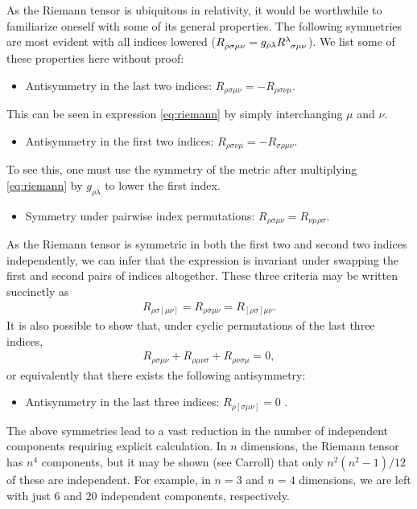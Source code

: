 \documentclass[10pt]{article}
\begin{document}
    \par As the Riemann tensor is ubiquitous in relativity, it would be worthwhile to familiarize oneself with some of its general properties. The following symmetries are most evident with all indices lowered ($\tensor{R}{_\rho_\sigma_\mu_\nu}=g_{\rho\lambda}\tensor{R}{^\lambda_\sigma_\mu_\nu}$). We list some of these properties here without proof:
    \begin{itemize}
		\item Antisymmetry in the last two indices:	$R_{\rho\sigma \mu \nu} = -R_{\rho\sigma \nu \mu} $.
    \end{itemize}
    This can be seen in expression \eqref{eq:riemann} by simply interchanging $\mu$ and $\nu$. 
    \begin{itemize}
    	\item Antisymmetry in the first two indices:	$R_{\rho\sigma \nu \mu} = -R_{\sigma \rho\mu \nu} $.
    \end{itemize}
    To see this, one must use the symmetry of the metric after multiplying \eqref{eq:riemann} by $g_{\rho\lambda}$ to lower the first index. 
    \begin{itemize}
    	\item Symmetry under pairwise index permutations:	 $R_{\rho\sigma \mu \nu} = R_{\nu \mu \rho\sigma} $.
    \end{itemize}
    As the Riemann tensor is symmetric in both the first two and second two indices independently, we can infer that the expression is invariant under swapping the first and second pairs of indices altogether. These three criteria may be written succinctly as 
    \begin{align}
   		R_{\rho\sigma \left[\mu \nu\right]} = R_{\rho\sigma\mu\nu} = R_{[\rho\sigma]\mu\nu} . \label{eq:pair_symmetries}
   	\end{align}
   	It is also possible to show that, under cyclic permutations of the last three indices, 
   	\begin{align}
    	 R_{\rho\sigma\mu\nu} + R_{\rho\mu\nu\sigma} + R_{\rho\nu\sigma\mu} = 0,
    \end{align}
    or equivalently that there exists the following antisymmetry:
    \begin{itemize}
    	\item Antisymmetry in the last three indices: $R_{\rho\left[\sigma\mu\nu\right]}=0$ .
    \end{itemize}
    The above symmetries lead to a vast reduction in the number of independent components requiring explicit calculation. In $n$ dimensions, the Riemann tensor has $n^4$ components, but it may be shown (see Carroll) that only $n^2 (n^2-1)/12$ of these are independent. For example, in $n=3$ and $n=4$ dimensions, we are left with just $6$ and $20$ independent components, respectively. 
\end{document}
